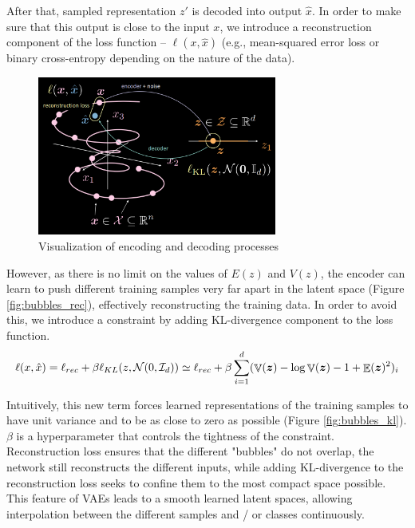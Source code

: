 After that, sampled representation $z'$ is decoded into output $\hat{x}$. In order to make sure that this output is close to the input $x$, we introduce a reconstruction component of the loss function -- $\ell(x,\hat{x})$ (e.g., mean-squared error loss or binary cross-entropy depending on the nature of the data).

\begin{figure}[H]
    \centering
    \includegraphics[width=0.7\textwidth]{figs/vae_expl.png}
    \caption{Visualization of encoding and decoding processes}
    \label{fig:vae_expl}
\end{figure}

However, as there is no limit on the values of $E(z)$ and $V(z)$, the encoder can learn to push different training samples very far apart in the latent space (Figure \ref{fig:bubbles_rec}), effectively reconstructing the training data. In order to avoid this, we introduce a constraint by adding KL-divergence component to the loss function.
\begin{align*}
    \ell(x, \hat{x}) = \ell_{rec} + \beta \ell_{KL} (z, \mathcal{N}(0, \mathcal{I}_d)) \simeq \ell_{rec} + \beta\sum_{i=1}^d (\mathop{\mathbb{V}}(\vect{z}) - \log{\mathop{\mathbb{V}}(\vect{z})} - 1 + \mathop{\mathbb{E}}(\vect{z})^2)_i
\end{align*}

Intuitively, this new term forces learned representations of the training samples to have unit variance and to be as close to zero as possible (Figure \ref{fig:bubbles_kl}). $\beta$ is a hyperparameter that controls the tightness of the constraint. Reconstruction loss ensures that the different "bubbles" do not overlap, the network still reconstructs the different inputs, while adding KL-divergence to the reconstruction loss seeks to confine them to the most compact space possible. This feature of VAEs leads to a smooth learned latent spaces, allowing interpolation between the different samples and / or classes continuously.

